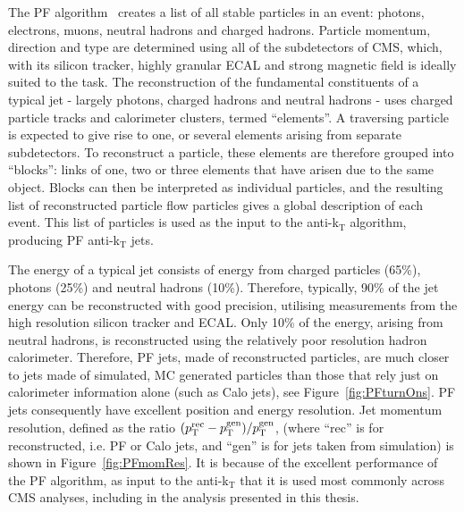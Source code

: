 The \ac{PF} algorithm~\cite{PFT-09-001} creates a list of all stable particles in an event: photons, electrons, muons, neutral hadrons and charged hadrons.
Particle momentum, direction and type are determined using all of the subdetectors of \ac{CMS}, 
which, with its silicon tracker, highly granular \ac{ECAL} and strong magnetic field is ideally suited to the task.
The reconstruction of the fundamental constituents of a typical jet - largely photons, charged hadrons and neutral hadrons - uses charged particle tracks and calorimeter clusters, termed ``elements''.
A traversing particle is expected to give rise to one, or several elements arising from separate subdetectors. 
To reconstruct a particle, these elements are therefore grouped into ``blocks'': links of one, two or three elements
that have arisen due to the same object.
Blocks can then be interpreted as individual particles, and the resulting list of reconstructed particle flow particles 
gives a global description of each event.
This list of particles is used as the input to the anti-k$_{\mathrm{T}}$ algorithm, producing \ac{PF} anti-k$_{\mathrm{T}}$ jets.

The energy of a typical jet consists of energy from charged particles (65\%), photons (25\%) and neutral hadrons (10\%).
Therefore, typically, 90\% of the jet energy can be reconstructed with good precision, utilising measurements from the high resolution silicon tracker and \ac{ECAL}. 
Only 10\% of the energy, arising from neutral hadrons, is reconstructed using the relatively poor resolution hadron calorimeter. 
Therefore, \ac{PF} jets, made of reconstructed particles, are much closer to jets made of simulated, \ac{MC} generated particles than those that rely just on calorimeter information alone (such as Calo jets), see Figure~\ref{fig:PFturnOns}.
\ac{PF} jets consequently have excellent position and energy resolution. 
Jet momentum resolution, defined as the ratio $(p_{\text{T}}^{\mathrm{rec}} - p_{\text{T}}^{\mathrm{gen}})/p_{\text{T}}^{\mathrm{gen}}$, (where ``rec'' is for reconstructed, i.e. \ac{PF} or Calo jets, and ``gen'' is for jets taken from simulation) 
is shown in Figure~\ref{fig:PFmomRes}.
It is because of the excellent performance of the \ac{PF} algorithm, as input to the anti-k$_{\mathrm{T}}$ that it is used most commonly across \ac{CMS} analyses, including in the analysis presented in this thesis.


